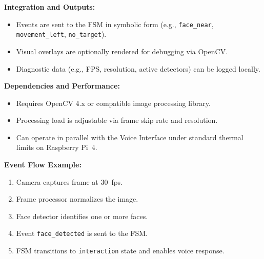 \vspace{0.5cm}

\noindent\textbf{Integration and Outputs:}
\begin{itemize}
    \item Events are sent to the FSM in symbolic form (e.g., \texttt{face\_near}, \texttt{movement\_left}, \texttt{no\_target}).
    \item Visual overlays are optionally rendered for debugging via OpenCV.
    \item Diagnostic data (e.g., FPS, resolution, active detectors) can be logged locally.
\end{itemize}

\vspace{0.5cm}

\noindent\textbf{Dependencies and Performance:}
\begin{itemize}
    \item Requires OpenCV 4.x or compatible image processing library.
    \item Processing load is adjustable via frame skip rate and resolution.
    \item Can operate in parallel with the Voice Interface under standard thermal limits on Raspberry Pi~4.
\end{itemize}

\vspace{0.5cm}

\noindent\textbf{Event Flow Example:}
\begin{enumerate}
    \item Camera captures frame at 30~fps.
    \item Frame processor normalizes the image.
    \item Face detector identifies one or more faces.
    \item Event \texttt{face\_detected} is sent to the FSM.
    \item FSM transitions to \texttt{interaction} state and enables voice response.
\end{enumerate}
